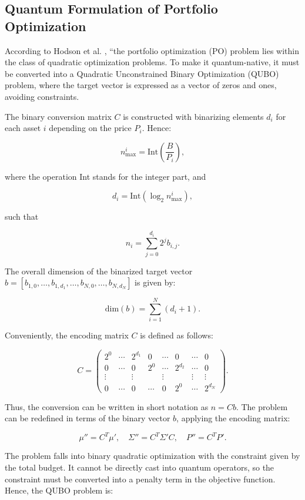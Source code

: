 \documentclass[%
 reprint,
 amsmath,amssymb,
 aps,
]{revtex4-2}
\begin{document}
\subsection{Quantum Formulation of Portfolio Optimization}
According to Hodson et al. \cite{Hodson2019}, ``the portfolio optimization (PO) problem lies within the class of quadratic optimization problems. To make it quantum-native, it must be converted into a Quadratic Unconstrained Binary Optimization (QUBO) problem, where the target vector is expressed as a vector of zeros and ones, avoiding constraints.

The binary conversion matrix $C$ is constructed with binarizing elements $d_i$ for each asset $i$ depending on the price $P_i$. Hence:

\[
n_{\text{max}}^i = \text{Int}\left(\frac{B}{P_i}\right),
\]

where the operation Int stands for the integer part, and

\[
d_i = \text{Int}\left(\log_2 n_{\text{max}}^i\right),
\]

such that

\[
n_i = \sum_{j=0}^{d_i} 2^j b_{i,j}.
\]

The overall dimension of the binarized target vector $b = \left[b_{1,0}, \dots, b_{1,d_1}, \dots, b_{N,0}, \dots, b_{N,d_N}\right]$ is given by:

\[
\text{dim}(b) = \sum_{i=1}^{N} (d_i + 1).
\]

Conveniently, the encoding matrix $C$ is defined as follows:

\[
C = \begin{pmatrix}
2^0 & \cdots & 2^{d_1} & 0 & \cdots & 0 & \cdots & 0 \\
0 & \cdots & 0 & 2^0 & \cdots & 2^{d_2} & \cdots & 0 \\
\vdots & & \vdots & & \vdots & & \vdots & \vdots \\
0 & \cdots & 0 & \cdots & 0 & 2^0 & \cdots & 2^{d_N}
\end{pmatrix}.
\]

Thus, the conversion can be written in short notation as $n = Cb$. The problem can be redefined in terms of the binary vector $b$, applying the encoding matrix:

\[
\mu'' = C^T \mu', \quad \Sigma'' = C^T \Sigma' C, \quad P'' = C^T P'.
\]

The problem falls into binary quadratic optimization with the constraint given by the total budget. It cannot be directly cast into quantum operators, so the constraint must be converted into a penalty term in the objective function. Hence, the QUBO problem is:
\end{document}
